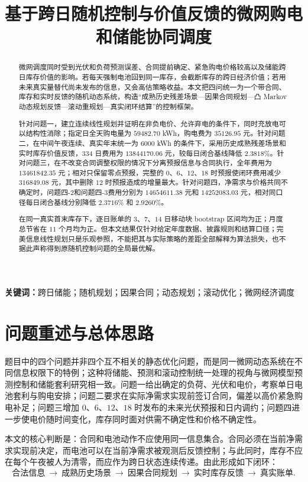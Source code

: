 \documentclass[UTF8,a4paper,zihao=-4,fontset=mac]{ctexart}
\title{基于跨日随机控制与价值反馈的微网购电和储能协同调度}
\author{}
\date{}
\begin{document}
\maketitle
\vspace{-2.1em}
\begin{abstract}
微网调度同时受到光伏和负荷预测误差、合同提前确定、紧急购电价格较高以及储能跨日库存价值的影响。若每天强制电池回到同一库存，会截断库存的跨日经济价值；若用未来真实量替代尚未发布的信息，又会高估策略收益。本文把四问统一为一个带合同、库存和实时反馈的随机动态系统，构造“成熟历史残差场景—因果合同规划—凸 Markov 动态规划反馈—滚动重规划—真实闭环结算”的控制框架。

针对问题一，建立连续线性规划并证明在非负电价、允许弃电的条件下，同时充放电可以结构性消除；指定日全天购电量为 $59482.70$ kWh，购电费为 $35126.95$ 元。针对问题二，在中间午夜连续、真实年末统一为 $6000$ kWh 的条件下，采用历史成熟残差场景和实时库存价值反馈，334 日费用为 $13844170.06$ 元，较每日闭合基线降低 $2.3818\%$。针对问题三，在不改变合同调整权限的情况下分离预报信息与合同执行，全年费用为 $13461842.35$ 元；相对只保留零点预报，完整的 $0$、$6$、$12$、$18$ 时预报使闭环费用减少 $316849.08$ 元，其中删除 $12$ 时预报造成的增量最大。针对问题四，净需求与价格共同不确定时，问题四-2和问题四-3费用分别为 $14654611.38$ 元和 $14252083.03$ 元，相对同口径每日闭合基线分别降低 $2.3716\%$ 和 $2.9260\%$。

在同一真实首末库存下，逐日账单的 $3$、$7$、$14$ 日移动块 bootstrap 区间均为正；月度总节省在 $11$ 个月均为正。但本文结果仅针对给定年度数据、披露规则和结算口径；完美信息线性规划只是乐观参照，不能把其与实际策略的差距全部解释为算法损失，也不据此声称得到原随机控制问题的全局最优解。
\end{abstract}
\noindent\textbf{关键词：}跨日储能；随机规划；因果合同；动态规划；滚动优化；微网经济调度

\section{问题重述与总体思路}
题目中的四个问题并非四个互不相关的静态优化问题，而是同一微网动态系统在不同信息权限下的特例；这种将储能、预测和滚动控制统一处理的视角与微网模型预测控制和储能套利研究相一致\cite{microgrid,storage}。问题一给出确定的负荷、光伏和电价，考察单日电池套利与购电安排；问题二要求在实际净需求实现前签订合同，偏差以高价紧急购电补足；问题三增加 $0$、$6$、$12$、$18$ 时发布的未来光伏预报和日内调约；问题四进一步使电价随时间变化，库存同时面对供需不确定性和价格不确定性。

本文的核心判断是：合同和电池动作不应使用同一信息集合。合同必须在当前净需求实现前决定，而电池可以在当前净需求被观测后反馈控制；与此同时，库存不应在每个午夜被人为清零，而应作为跨日状态连续传递。由此形成如下闭环：
\begin{equation}
\text{合法信息}\ \longrightarrow\ \text{成熟历史场景}\ \longrightarrow\ \text{因果合同规划}\ \longrightarrow\ \text{实时库存反馈}\ \longrightarrow\ \text{真实账单}.
\end{equation}
\end{document}
